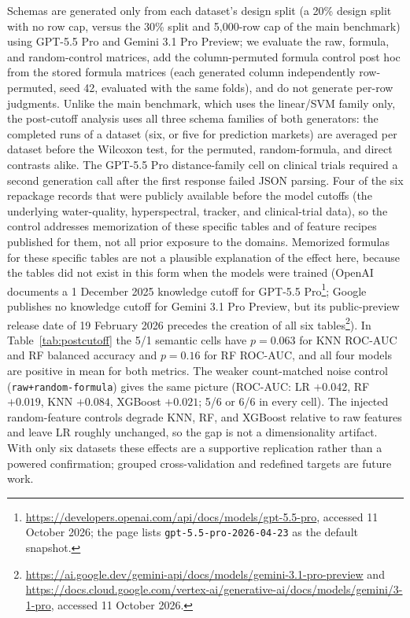 Schemas are generated only from each dataset's design split (a 20\% design split with no row cap, versus the 30\% split and 5,000-row cap of the main benchmark) using GPT-5.5 Pro and Gemini 3.1 Pro Preview; we evaluate the raw, formula, and random-control matrices, add the column-permuted formula control post hoc from the stored formula matrices (each generated column independently row-permuted, seed 42, evaluated with the same folds), and do not generate per-row judgments. Unlike the main benchmark, which uses the linear/SVM family only, the post-cutoff analysis uses all three schema families of both generators: the completed runs of a dataset (six, or five for prediction markets) are averaged per dataset before the Wilcoxon test, for the permuted, random-formula, and direct contrasts alike. The GPT-5.5 Pro distance-family cell on clinical trials required a second generation call after the first response failed JSON parsing. Four of the six repackage records that were publicly available before the model cutoffs (the underlying water-quality, hyperspectral, tracker, and clinical-trial data), so the control addresses memorization of these specific tables and of feature recipes published for them, not all prior exposure to the domains. Memorized formulas for these specific tables are not a plausible explanation of the effect here, because the tables did not exist in this form when the models were trained (OpenAI documents a 1 December 2025 knowledge cutoff for GPT-5.5 Pro\footnote{\url{https://developers.openai.com/api/docs/models/gpt-5.5-pro}, accessed 11 October 2026; the page lists \texttt{gpt-5.5-pro-2026-04-23} as the default snapshot.}; Google publishes no knowledge cutoff for Gemini 3.1 Pro Preview, but its public-preview release date of 19 February 2026 precedes the creation of all six tables\footnote{\url{https://ai.google.dev/gemini-api/docs/models/gemini-3.1-pro-preview} and \url{https://docs.cloud.google.com/vertex-ai/generative-ai/docs/models/gemini/3-1-pro}, accessed 11 October 2026.}). In Table~\ref{tab:postcutoff} the 5/1 semantic cells have \(p = 0.063\) for KNN ROC-AUC and RF balanced accuracy and \(p = 0.16\) for RF ROC-AUC, and all four models are positive in mean for both metrics. The weaker count-matched noise control (\texttt{raw+random-formula}) gives the same picture (ROC-AUC: LR \(+0.042\), RF \(+0.019\), KNN \(+0.084\), XGBoost \(+0.021\); 5/6 or 6/6 in every cell). The injected random-feature controls degrade KNN, RF, and XGBoost relative to raw features and leave LR roughly unchanged, so the gap is not a dimensionality artifact. With only six datasets these effects are a supportive replication rather than a powered confirmation; grouped cross-validation and redefined targets are future work.

